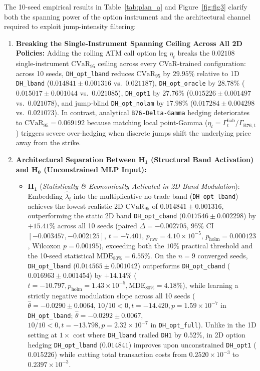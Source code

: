 \documentclass[11pt,a4paper]{article}
\begin{document}
\begin{table}[htbp]
\begin{minipage}{\textwidth}
  \end{minipage}
\end{table}

The 10-seed empirical results in Table~\ref{tab:plan_a} and Figure~\ref{fig:fig3} clarify both the spanning power of the option instrument and the architectural channel required to exploit jump-intensity filtering:
\begin{enumerate}
  \item \textbf{Breaking the Single-Instrument Spanning Ceiling Across All 2D Policies:} Adding the rolling ATM call option leg $\eta_t$ breaks the $0.02108$ single-instrument $\text{CVaR}_{95}$ ceiling across every CVaR-trained configuration: across 10 seeds, \texttt{DH\_opt\_lband} reduces $\text{CVaR}_{95}$ by $29.95\%$ relative to 1D \texttt{DH\_lband} ($0.014841 \pm 0.001316$ vs.\ $0.021187$), \texttt{DH\_opt\_oracle} by $28.78\%$ ($0.015017 \pm 0.001044$ vs.\ $0.021085$), \texttt{DH\_opt1} by $27.76\%$ ($0.015226 \pm 0.001497$ vs.\ $0.021078$), and jump-blind \texttt{DH\_opt\_nolam} by $17.98\%$ ($0.017284 \pm 0.004298$ vs.\ $0.021073$). In contrast, analytical \texttt{B76-Delta-Gamma} hedging deteriorates to $\text{CVaR}_{95} = 0.069192$ because matching local point-Gamma ($\eta_t = \Gamma^{\text{liab}}_t / \Gamma_{\text{B76},t}$) triggers severe over-hedging when discrete jumps shift the underlying price away from the strike.
  \item \textbf{Architectural Separation Between $\mathbf{H_1}$ (Structural Band Activation) and $\mathbf{H_0}$ (Unconstrained MLP Input):}
  \begin{itemize}
    \item $\mathbf{H_1}$ (\emph{Statistically \& Economically Activated in 2D Band Modulation}): Embedding $\hat{\lambda}_t$ into the multiplicative no-trade band (\texttt{DH\_opt\_lband}) achieves the lowest realistic 2D $\text{CVaR}_{95}$ of $0.014841 \pm 0.001316$, outperforming the static 2D band \texttt{DH\_opt\_cband} ($0.017546 \pm 0.002298$) by $+15.41\%$ across all 10 seeds (paired $\Delta = -0.002705$, $95\%$ CI $[-0.003457, -0.002125]$, $t = -7.401$, $p_{\text{raw}} = 4.10 \times 10^{-5}$, $p_{\text{holm}} = 0.000123$, Wilcoxon $p = 0.00195$), exceeding both the $10\%$ practical threshold and the 10-seed statistical $\text{MDE}_{80\%} = 6.55\%$. On the $n = 9$ converged seeds, \texttt{DH\_opt\_lband} ($0.014565 \pm 0.001042$) outperforms \texttt{DH\_opt\_cband} ($0.016963 \pm 0.001454$) by $+14.14\%$ ($t = -10.797, p_{\text{holm}} = 1.43 \times 10^{-5}, \text{MDE}_{80\%} = 4.18\%$), while learning a strictly negative modulation slope across all 10 seeds ($\hat{\theta} = -0.0290 \pm 0.0064$, $10/10 < 0, t = -14.420, p = 1.59 \times 10^{-7}$ in \texttt{DH\_opt\_lband}; $\hat{\theta} = -0.0292 \pm 0.0067$, $10/10 < 0, t = -13.798, p = 2.32 \times 10^{-7}$ in \texttt{DH\_opt\_full}). Unlike in the 1D setting at $1\times$ cost where \texttt{DH\_lband} trailed \texttt{DH1} by $0.52\%$, in 2D option hedging \texttt{DH\_opt\_lband} ($0.014841$) improves upon unconstrained \texttt{DH\_opt1} ($0.015226$) while cutting total transaction costs from $0.2520 \times 10^{-3}$ to $0.2397 \times 10^{-3}$.

\end{itemize}
\end{enumerate}
\end{document}

